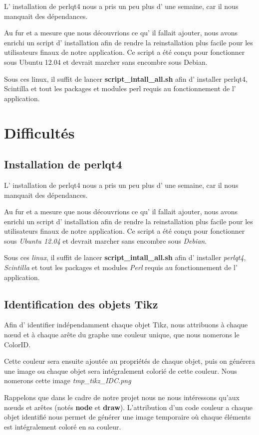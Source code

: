 \documentclass[a4paper]{report}
\begin{document}
L' installation de perlqt4 nous a pris un peu plus d' une semaine,
car il nous manquait des dépendances.

Au fur et a mesure que nous découvrions ce qu' il fallait ajouter,
nous avons enrichi un script d' installation afin de rendre la reinstallation
plus facile pour les utilisateurs finaux de notre application. Ce
script a été conçu pour fonctionner sous Ubuntu 12.04 et devrait marcher
sans encombre sous Debian.

Sous ces linux, il suffit de lancer \textbf{script\_intall\_all.sh}
afin d' installer perlqt4, Scintilla et tout les packages et modules
perl requis au fonctionnement de l' application.

\section{Difficultés}
\subsection{Installation de perlqt4}
L' installation de perlqt4 nous a pris un peu plus d' une semaine,
car il nous manquait des dépendances.

Au fur et a mesure que nous découvrions ce qu' il fallait ajouter,
nous avons enrichi un script d' installation afin de rendre la reinstallation
plus facile pour les utilisateurs finaux de notre application. Ce
script a été conçu pour fonctionner sous \textit{Ubuntu 12.04} et devrait marcher
sans encombre sous \textit{Debian}.

Sous ces \textit{linux}, il suffit de lancer \textbf{script\_intall\_all.sh}
afin d' installer \textit{perlqt4}, \textit{Scintilla} et tout les packages et modules
\textit{Perl} requis au fonctionnement de l' application.

\subsection{Identification des objets Tikz}
Afin d' identifier indépendamment chaque objet Tikz, nous attribuons à chaque n{\oe}ud et à chaque arête du graphe une couleur unique, que nous nomerons le ColorID.

Cette couleur sera ensuite ajoutée au propriétés de chaque objet, puis on générera une image ou chaque objet sera intégralement colorié de cette couleur. 
Nous nomerons cette image \textit{tmp\_tikz\_IDC.png}


Rappelons que dans le cadre de notre projet nous ne nous intéressons qu'aux n{\oe}uds et arêtes (notés \textbf{node} et \textbf{draw}). L'attribution d'un code couleur a chaque objet identifié nous permet de générer une image temporaire où chaque éléments est intégralement coloré en sa couleur.
\end{document}
